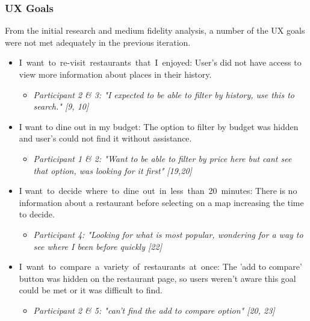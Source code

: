 \documentclass[a4 paper, 12pt]{article}
\begin{document}
    \subsubsection{UX Goals}  
    From the initial research and medium fidelity analysis, a number of the UX goals were not met adequately in the previous iteration.
        \begin{itemize}
            \item I want to re-visit restaurants that I enjoyed: User's did not have access to view more information about places in their history. 
                \begin{itemize}
                    \item \textit{Participant 2 \& 3: "I expected to be able to filter by history, use this to search." [9, 10]}
                \end{itemize}            
            \item I want to dine out in my budget: The option to filter by budget was hidden and user's could not find it without assistance.
                \begin{itemize}
                    \item \textit{Participant 1 \& 2: "Want to be able to filter by price here but cant see that option, was looking for it first" [19,20]}
                \end{itemize}            
            \item I want to decide where to dine out in less than 20 minutes: There is no information about a restaurant before selecting on a map increasing the time to decide. 
                \begin{itemize}
                    \item \textit{Participant 4: "Looking for what is most popular, wondering for a way to see where I been before quickly [22]}
                \end{itemize}            
            \item I want to compare a variety of restaurants at once: The 'add to compare' button was hidden on the restaurant page, so users weren't aware this goal could be met or it was difficult to find. 
                \begin{itemize}
                    \item \textit{Participant 2 \& 5: "can't find the add to compare option" [20, 23]}
                \end{itemize}            
        \end{itemize}
\end{document}
